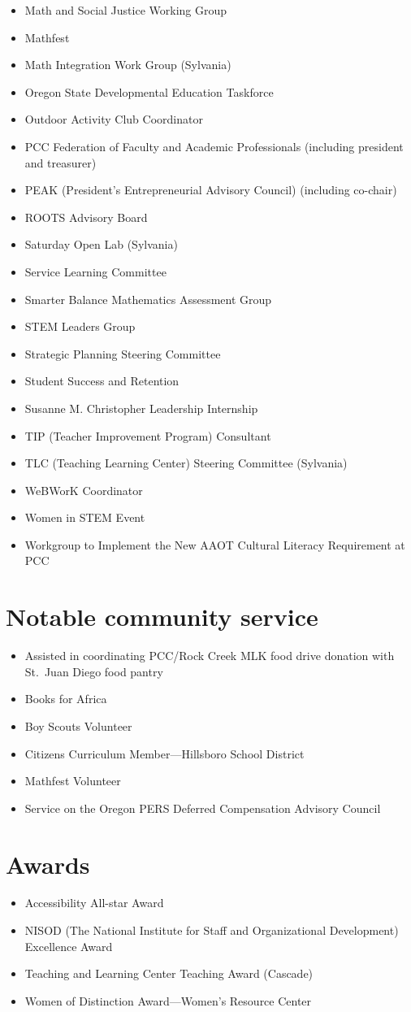\begin{itemize}[label={}]
\item Math and Social Justice Working Group
\item Mathfest
\item Math Integration Work Group (Sylvania)
\item Oregon State Developmental Education Taskforce
\item Outdoor Activity Club Coordinator
\item PCC Federation of Faculty and Academic Professionals (including president and treasurer)
\item PEAK (President's Entrepreneurial Advisory Council) (including co-chair)
\item ROOTS Advisory Board
\item Saturday Open Lab (Sylvania)
\item Service Learning Committee
\item Smarter Balance Mathematics Assessment Group
\item STEM Leaders Group
\item Strategic Planning Steering Committee
\item Student Success and Retention
\item Susanne M. Christopher Leadership Internship
\item TIP (Teacher Improvement Program) Consultant
\item TLC (Teaching Learning Center) Steering Committee (Sylvania)
\item WeBWorK Coordinator
\item Women in STEM Event
\item Workgroup to Implement the New AAOT Cultural Literacy Requirement at PCC
\end{itemize}

\section*{Notable community service}

\begin{itemize}
\item Assisted in coordinating PCC/Rock Creek MLK food drive donation with St.\ Juan Diego food pantry
\item Books for Africa
\item Boy Scouts Volunteer
\item Citizens Curriculum Member---Hillsboro School District
\item Mathfest Volunteer
\item Service on the Oregon PERS Deferred Compensation Advisory Council
\end{itemize}

\section*{Awards}

\begin{itemize}
\item Accessibility All-star Award
\item NISOD (The National Institute for Staff and Organizational Development) Excellence Award
\item Teaching and Learning Center Teaching Award (Cascade)
\item Women of Distinction Award---Women's Resource Center
\end{itemize}
